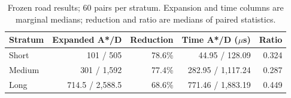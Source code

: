 \begin{table}[H]
\caption{Frozen road results; 60 pairs per stratum. Expansion and time columns are marginal medians; reduction and ratio are medians of paired statistics.}\label{tab:road}
\centering\begin{tabular}{lrrrr}\toprule
Stratum & Expanded A*/D & Reduction & Time A*/D ($\mu$s) & Ratio\\\midrule
Short &101 / 505&78.6\%&44.95 / 128.09&0.324\\
Medium &301 / 1,592&77.4\%&282.95 / 1,117.24&0.287\\
Long &714.5 / 2,588.5&68.6\%&771.46 / 1,883.19&0.449\\\bottomrule
\end{tabular}
\end{table}
